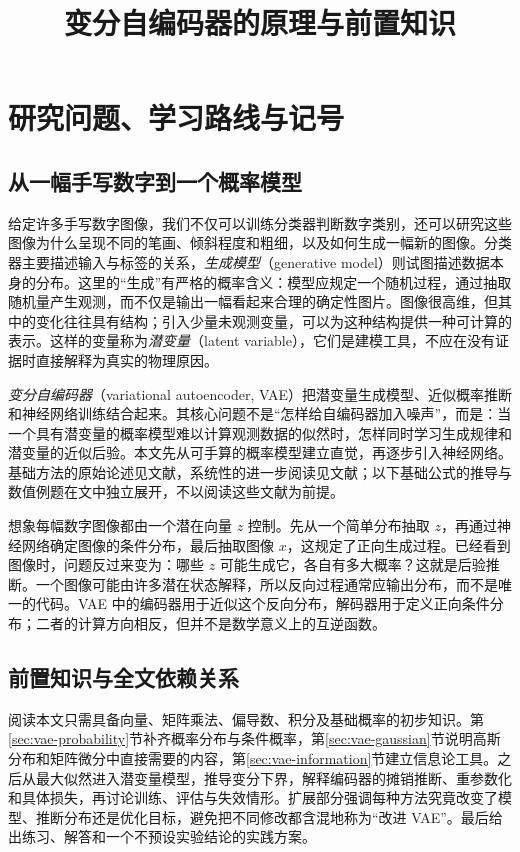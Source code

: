 \documentclass[UTF8,12pt,a4paper,fontset=fandol]{ctexart}
\title{变分自编码器的原理与前置知识}
\author{}
\date{}
\begin{document}
\maketitle
\tableofcontents

\section{研究问题、学习路线与记号}
\label{sec:vae-introduction}

\subsection{从一幅手写数字到一个概率模型}
给定许多手写数字图像，我们不仅可以训练分类器判断数字类别，还可以研究这些图像为什么呈现不同的笔画、倾斜程度和粗细，以及如何生成一幅新的图像。分类器主要描述输入与标签的关系，\emph{生成模型}（generative model）则试图描述数据本身的分布。这里的“生成”有严格的概率含义：模型应规定一个随机过程，通过抽取随机量产生观测，而不仅是输出一幅看起来合理的确定性图片。图像很高维，但其中的变化往往具有结构；引入少量未观测变量，可以为这种结构提供一种可计算的表示。这样的变量称为\emph{潜变量}（latent variable），它们是建模工具，不应在没有证据时直接解释为真实的物理原因。

\emph{变分自编码器}（variational autoencoder, VAE）把潜变量生成模型、近似概率推断和神经网络训练结合起来。其核心问题不是“怎样给自编码器加入噪声”，而是：当一个具有潜变量的概率模型难以计算观测数据的似然时，怎样同时学习生成规律和潜变量的近似后验。本文先从可手算的概率模型建立直觉，再逐步引入神经网络。基础方法的原始论述见文献\cite{kingma2014}，系统性的进一步阅读见文献\cite{kingma2019}；以下基础公式的推导与数值例题在文中独立展开，不以阅读这些文献为前提。

想象每幅数字图像都由一个潜在向量 $z$ 控制。先从一个简单分布抽取 $z$，再通过神经网络确定图像的条件分布，最后抽取图像 $x$，这规定了正向生成过程。已经看到图像时，问题反过来变为：哪些 $z$ 可能生成它，各自有多大概率？这就是后验推断。一个图像可能由许多潜在状态解释，所以反向过程通常应输出分布，而不是唯一的代码。VAE 中的编码器用于近似这个反向分布，解码器用于定义正向条件分布；二者的计算方向相反，但并不是数学意义上的互逆函数。

\subsection{前置知识与全文依赖关系}
阅读本文只需具备向量、矩阵乘法、偏导数、积分及基础概率的初步知识。第\ref{sec:vae-probability}节补齐概率分布与条件概率，第\ref{sec:vae-gaussian}节说明高斯分布和矩阵微分中直接需要的内容，第\ref{sec:vae-information}节建立信息论工具。之后从最大似然进入潜变量模型，推导变分下界，解释编码器的摊销推断、重参数化和具体损失，再讨论训练、评估与失效情形。扩展部分强调每种方法究竟改变了模型、推断分布还是优化目标，避免把不同修改都含混地称为“改进 VAE”。最后给出练习、解答和一个不预设实验结论的实践方案。
\end{document}
